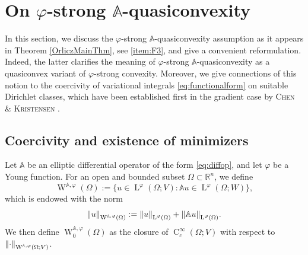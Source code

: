 \documentclass[a4paper,11pt]{amsart}
\numberwithin{equation}{section}
\newcommand{\R}{\mathbb{R}}
\newcommand{\lebe}{\operatorname{L}}
\newcommand{\sobo}{\operatorname{W}}
\newcommand{\hold}{\operatorname{C}}
\begin{document}
	\section{On $\varphi$-strong $\mathbb{A}$-quasiconvexity} \label{sec:quasiconvex}
	In this section, we discuss the $\varphi$-strong $\mathbb{A}$-quasiconvexity assumption as it appears in Theorem \ref{OrliczMainThm}, see \ref{item:F3}, and give a convenient reformulation. Indeed, the latter clarifies the meaning of $\varphi$-strong $\mathbb{A}$-quasiconvexity as a quasiconvex variant of $\varphi$-strong convexity. Moreover, we give connections of this notion to the coercivity of variational integrals \eqref{eq:functionalform} on suitable Dirichlet classes, which have been established first in the gradient case by \textsc{Chen \& Kristensen} \cite{chen_coercive}. 
	\subsection{Coercivity and existence of minimizers}
	Let $\mathbb{A}$ be an elliptic differential operator of the form \eqref{eq:diffop}, and let $\varphi$ be a Young function. For an open and bounded subset $\Omega\subset\R^{n}$, we define \[
	\sobo^{\mathbb{A}, \varphi}(\Omega) := \{u \in \lebe^\varphi(\Omega;V): \mathbb{A}u \in \lebe^\varphi(\Omega;W)\}, 
	\]
	which is endowed with the norm \[
	\norm{u}_{\sobo^{\mathbb{A}, \varphi}(\Omega) } := \norm{u}_{\lebe^\varphi(\Omega)} + \norm{\mathbb{A}u}_{\lebe^\varphi(\Omega)}. 
	\]
	We then define $\sobo^{\mathbb{A}, \varphi}_0(\Omega)$ as the closure of $\hold_c^\infty(\Omega;V)$ with respect to $\norm{\cdot}_{\sobo^{\mathbb{A}, \varphi}(\Omega;V) } $. 
	
\end{document}
